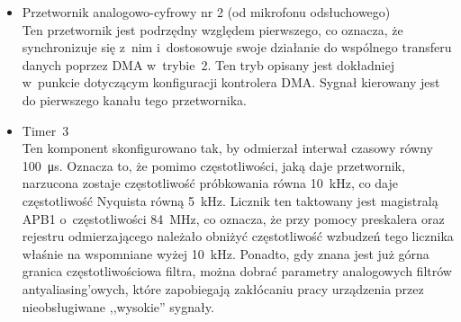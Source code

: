 \begin{itemize}
\begin{center}
\end{center}
	W~związku z~tym, przetwornik w~takiej konfiguracji mógłby efektywnie konwertować sygnały o~maksymalnej częstotliwości równej \SI{250}{\kHz}. Należy jednak wziąć pod uwagę fakt, że sygnały audio słyszalne dla człowieka zawierają się w~zakresie od około \SI{20}{\Hz} do około \SI{20000}{\Hz}, co oznacza, że należy znacznie ograniczyć częstotliwość pracy układu. Dodatkowo, sygnały które zazwyczaj tłumi się aktywnie, zajmują dolną część pasma częstotliwościowego, zatem można jeszcze bardziej ograniczyć tę częstotliwość próbkowania. Takie ograniczenie osiągnięto biorąc pod uwagę czas, jaki zajmują obliczenia generujące sygnał przeciwstawny, częstotliwość wzbudzeń pochodzących od timera oraz czas konwersji DAC. Wszystkie te oraz inne czynniki składają się na zmniejszenie efektywnej zdolności przetwarzania układu. Głównym czynnikiem motywującym wybór tak krótkiego czasu konwersji sygnału jest konieczność zminimalizowania elektronicznego narzutu czasowego wykonanych operacji. Czas, jaki zajmą wszystkie operacje układu, nie może przekroczyć czasu, który fali akustycznej zajmuje przebycie drogi od pierwszego mikrofonu do drugiego. Przekroczenie tej granicy spowodowałoby zupełną nieprzydatność urządzenia -- odpowiedź filtra byłaby spóźniona i~co najwyżej powielałaby hałas.
	\item Przetwornik analogowo-cyfrowy nr 2 (od mikrofonu odsłuchowego)\\
	Ten przetwornik jest podrzędny względem pierwszego, co oznacza, że synchronizuje się z~nim i~dostosowuje swoje działanie do wspólnego transferu danych poprzez DMA w~trybie~2. Ten tryb opisany jest dokładniej w~punkcie dotyczącym konfiguracji kontrolera DMA. Sygnał kierowany jest do pierwszego kanału tego przetwornika.
	\item Timer~3\\
	Ten komponent skonfigurowano tak, by odmierzał interwał czasowy równy \SI{100}{\micro\s}. Oznacza to, że pomimo częstotliwości, jaką daje przetwornik, narzucona zostaje częstotliwość próbkowania równa \SI{10}{\kHz}, co daje częstotliwość Nyquista równą \SI{5}{\kHz}. Licznik ten taktowany jest magistralą APB1 o~częstotliwości \SI{84}{\MHz}, co oznacza, że przy pomocy preskalera oraz rejestru odmierzającego należało obniżyć częstotliwość wzbudzeń tego licznika właśnie na wspomniane wyżej \SI{10}{\kHz}. Ponadto, gdy znana jest już górna granica częstotliwościowa filtra, można dobrać parametry analogowych filtrów antyaliasing'owych, które zapobiegają zakłócaniu pracy urządzenia przez nieobsługiwane ,,wysokie'' sygnały.

\end{itemize}
